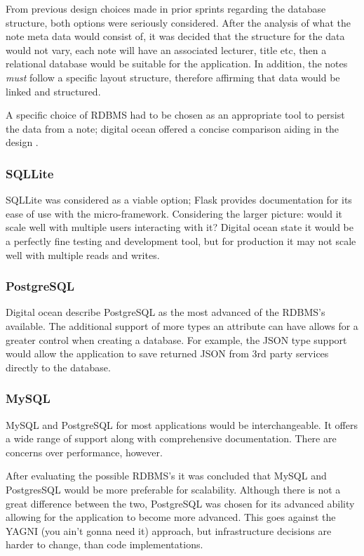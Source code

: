 From previous design choices made in prior sprints regarding the database structure, both options were seriously considered. After the analysis of what the note meta data would consist of, it was decided that the structure for the data would not vary, each note will have an associated lecturer, title etc, then a relational database would be suitable for the application. In addition, the notes \textit{must} follow a specific layout structure, therefore affirming that data would be linked and structured.

A specific choice of RDBMS had to be chosen as an appropriate tool to persist the data from a note; digital ocean offered a concise comparison aiding in the design \cite{citeulike:14019772}.
\subsubsection{SQLLite}
SQLLite was considered as a viable option; Flask provides documentation for its ease of use with the micro-framework. Considering the larger picture: would it scale well with multiple users interacting with it? Digital ocean state it would be a perfectly fine testing and development tool, but for production it may not scale well with multiple reads and writes.
\subsubsection{PostgreSQL}
Digital ocean describe PostgreSQL as the most advanced of the RDBMS's available. The additional support of more types an attribute can have allows for a greater control when creating a database. For example, the JSON type support would allow the application to save returned JSON from 3rd party services directly to the database.
\subsubsection{MySQL}
MySQL and PostgreSQL for most applications would be interchangeable. It offers a wide range of support along with comprehensive documentation. There are concerns over performance, however.

\noindent
After evaluating the possible RDBMS's it was concluded that MySQL and PostgresSQL would be more preferable for scalability. Although there is not a great difference between the two, PostgreSQL was chosen for its advanced ability allowing for the application to become more advanced. This goes against the YAGNI (you ain't gonna need it) approach, but infrastructure decisions are harder to change, than code implementations.

